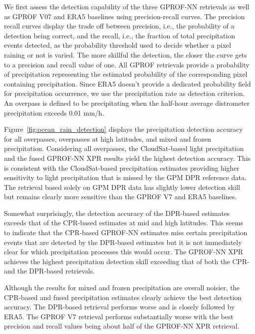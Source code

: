 \documentclass{ametsocV6.1}
\begin{document}
We first assess the detection capability of the three GPROF-NN retrievals as
well as GPROF V07 and ERA5 baselines using precision-recall curves. The
precision recall curves display the trade off between precision, i.e., the
probability of a detection being correct, and the recall, i.e., the fraction of
total precipitation events detected, as the probability threshold used to decide
whether a pixel raining or not is varied. The more skillful the detection, the
closer the curve gets to a precision and recall value of one. All GPROF
retrievals provide a probability of precipitation representing the estimated
probability of the corresponding pixel containing precipitation. Since ERA5
doesn’t provide a dedicated probability field for precipitation occurrence, we
use the precipitation rate as detection criterion. An overpass is defined to be
precipitating when the half-hour average distrometer precipitation exceeds 0.01
mm/h.

Figure~\ref{fig:ocean_rain_detection} displays the precipitation detection
accuracy for all overpasses, overpasses at high latitudes, and mixed and frozen
precipitation. Considering all overpasses, the CloudSat-based light
precipitation and the fused GPROF-NN XPR results yield the highest detection
accuracy. This is consistent with the CloudSat-based precipitation estimates
providing higher sensitivity to light precipitation that is missed by the GPM
DPR reference data. The retrieval based solely on GPM DPR data has slightly
lower detection skill but remains clearly more sensitive than the GPROF V7 and
ERA5 baselines.

Somewhat surprisingly, the detection accuracy of the DPR-based estimates exceeds
that of the CPR-based estimates at mid and high latitudes. This seems to
indicate that the CPR-based GPROF-NN estimates miss certain precipitation events
that are detected by the DPR-based estimates but it is not immediately clear for
which precipitation processes this would occur. The GPROF-NN XPR achieves the
highest precipitation detection skill exceeding that of both the CPR- and the
DPR-based retrievals.

Although the results for mixed and frozen precipitation are overall noisier, the
CPR-based and fused precipitation estimates clearly achieve the best detection
accuracy. The DPR-based retrieval performs worse and is closely followed by
ERA5. The GPROF V7 retrieval performs substantially worse with the best
precision and recall values being about half of the GPROF-NN XPR retrieval.
\end{document}
